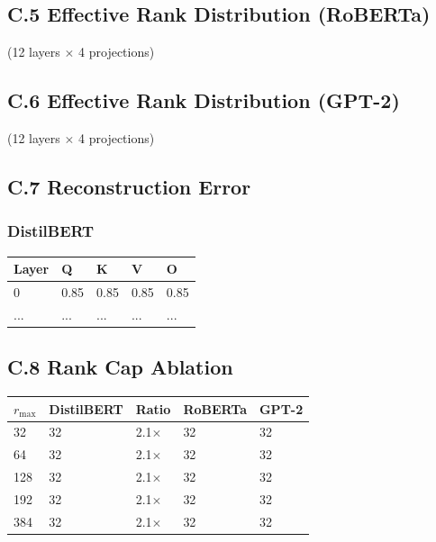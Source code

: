 \subsection{C.5 Effective Rank Distribution (RoBERTa)}

(12 layers $\times$ 4 projections)

\subsection{C.6 Effective Rank Distribution (GPT-2)}

(12 layers $\times$ 4 projections)

\subsection{C.7 Reconstruction Error}

\subsubsection{DistilBERT}
\begin{table}[H]
\centering
\small
\begin{tabular}{lllll}
\toprule
\textbf{Layer} & \textbf{Q} & \textbf{K} & \textbf{V} & \textbf{O} \\
\midrule
0 & 0.85 & 0.85 & 0.85 & 0.85 \\
... & ... & ... & ... & ... \\
\bottomrule
\end{tabular}
\end{table}

\subsection{C.8 Rank Cap Ablation}

\begin{table}[H]
\centering
\small
\begin{tabular}{lllll}
\toprule
\textbf{$r_\text{max}$} & \textbf{DistilBERT} & \textbf{Ratio} & \textbf{RoBERTa} & \textbf{GPT-2} \\
\midrule
32 & 32 & 2.1$\times$ & 32 & 32 \\
64 & 32 & 2.1$\times$ & 32 & 32 \\
128 & 32 & 2.1$\times$ & 32 & 32 \\
192 & 32 & 2.1$\times$ & 32 & 32 \\
384 & 32 & 2.1$\times$ & 32 & 32 \\
\bottomrule
\end{tabular}
\end{table}

